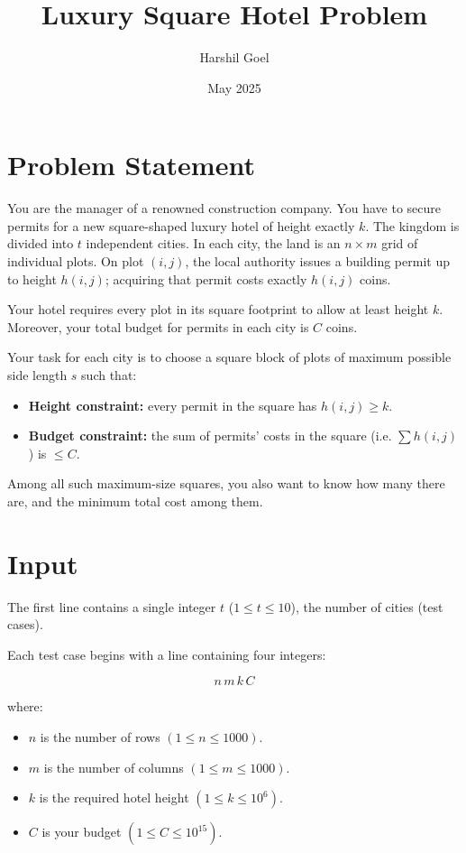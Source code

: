 \documentclass{article}
\title{\textbf{Luxury Square Hotel Problem}}
\author{Harshil Goel}
\date{May 2025}
\begin{document}
\maketitle

\section*{Problem Statement}

You are the manager of a renowned construction company. You have to secure permits for a new square-shaped luxury hotel of height exactly $k$. The kingdom is divided into $t$ independent cities. In each city, the land is an $n \times m$ grid of individual plots. On plot $(i, j)$, the local authority issues a building permit up to height $h(i,j)$; acquiring that permit costs exactly $h(i,j)$ coins.

Your hotel requires every plot in its square footprint to allow at least height $k$. Moreover, your total budget for permits in each city is $C$ coins.

Your task for each city is to choose a square block of plots of maximum possible side length $s$ such that:

\begin{itemize}
    \item \textbf{Height constraint:} every permit in the square has $h(i,j) \geq k$.
    \item \textbf{Budget constraint:} the sum of permits’ costs in the square (i.e. $\sum h(i,j)$) is $\leq C$.
\end{itemize}

Among all such maximum-size squares, you also want to know how many there are, and the minimum total cost among them.

\section*{Input}

The first line contains a single integer $t$ ($1 \leq t \leq 10$), the number of cities (test cases).

Each test case begins with a line containing four integers:

\[
n \, m \, k \, C
\]

where:
\begin{itemize}
    \item $n$ is the number of rows $(1 \leq n \leq 1000)$.
    \item $m$ is the number of columns $(1 \leq m \leq 1000)$.
    \item $k$ is the required hotel height $(1 \leq k \leq 10^6)$.
    \item $C$ is your budget $(1 \leq C \leq 10^{15})$.
\end{itemize}
\end{document}
